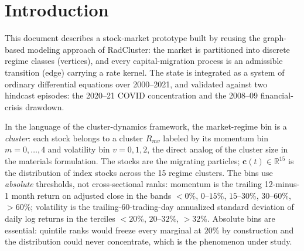 \documentclass[11pt,a4paper]{article}
\begin{document}
\section{Introduction}
This document describes a stock-market prototype built by reusing the
graph-based modeling approach of RadCluster: the market is partitioned into
discrete regime classes (vertices), and every capital-migration process is an
admissible transition (edge) carrying a rate kernel.  The state is integrated
as a system of ordinary differential equations over 2000--2021, and validated
against two hindcast episodes: the 2020--21 COVID concentration and the
2008--09 financial-crisis drawdown.

In the language of the cluster-dynamics framework, the market-regime bin is
a \emph{cluster}: each stock belongs to a cluster $R_{mv}$ labeled by its
momentum bin $m=0,\dots,4$ and volatility bin $v=0,1,2$, the direct analog of
the cluster size in the materials formulation.  The stocks are the migrating
particles; $\mathbf{c}(t)\in\mathbb{R}^{15}$ is the distribution of index
stocks across the 15 regime clusters.  The bins use \emph{absolute}
thresholds, not cross-sectional ranks: momentum is the trailing 12-minus-1
month return on adjusted close in the bands
$<0\%$, $0$--$15\%$, $15$--$30\%$, $30$--$60\%$, $>60\%$;
volatility is the trailing-60-trading-day annualized standard deviation of
daily log returns in the terciles $<20\%$, $20$--$32\%$, $>32\%$.
Absolute bins are essential: quintile ranks would freeze every marginal at
$20\%$ by construction and the distribution could never concentrate, which
is the phenomenon under study.
\end{document}
